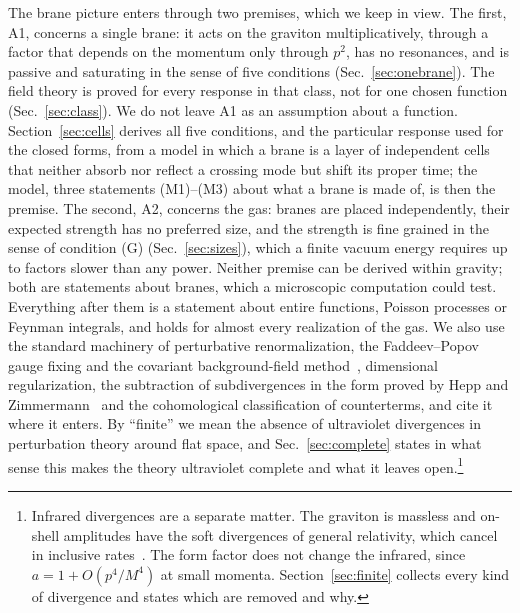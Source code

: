 \documentclass[a4paper,11pt]{article}
\begin{document}
The brane picture enters through two premises, which we keep in view. The first, A1, concerns a single brane: it acts on the graviton multiplicatively, through a factor that depends on the momentum only through $p^2$, has no resonances, and is passive and saturating in the sense of five conditions (Sec.~\ref{sec:onebrane}). The field theory is proved for every response in that class, not for one chosen function (Sec.~\ref{sec:class}). We do not leave A1 as an assumption about a function. Section~\ref{sec:cells} derives all five conditions, and the particular response used for the closed forms, from a model in which a brane is a layer of independent cells that neither absorb nor reflect a crossing mode but shift its proper time; the model, three statements (M1)--(M3) about what a brane is made of, is then the premise. The second, A2, concerns the gas: branes are placed independently, their expected strength has no preferred size, and the strength is fine grained in the sense of condition (G) (Sec.~\ref{sec:sizes}), which a finite vacuum energy requires up to factors slower than any power. Neither premise can be derived within gravity; both are statements about branes, which a microscopic computation could test. Everything after them is a statement about entire functions, Poisson processes or Feynman integrals, and holds for almost every realization of the gas. We also use the standard machinery of perturbative renormalization, the Faddeev--Popov gauge fixing and the covariant background-field method~\cite{FaddeevPopov1967,DeWitt1967}, dimensional regularization, the subtraction of subdivergences in the form proved by Hepp and Zimmermann~\cite{Hepp1966,Zimmermann1969} and the cohomological classification of counterterms, and cite it where it enters. By ``finite'' we mean the absence of ultraviolet divergences in perturbation theory around flat space, and Sec.~\ref{sec:complete} states in what sense this makes the theory ultraviolet complete and what it leaves open.\footnote{Infrared divergences are a separate matter. The graviton is massless and on-shell amplitudes have the soft divergences of general relativity, which cancel in inclusive rates~\cite{Weinberg1965}. The form factor does not change the infrared, since $a=1+O(p^4/M^4)$ at small momenta. Section~\ref{sec:finite} collects every kind of divergence and states which are removed and why.}
\end{document}
